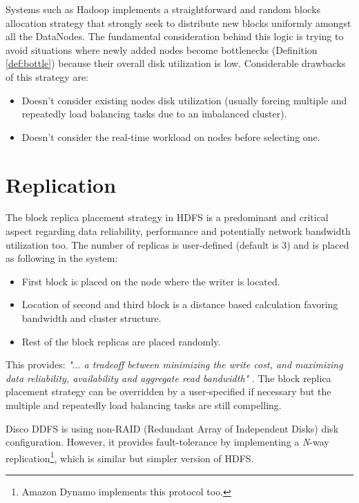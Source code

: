 Systems such as Hadoop implements a straightforward and random blocks allocation strategy that strongly seek to distribute new blocks uniformly amongst all the DataNodes. The fundamental consideration behind this logic is trying to avoid situations where newly added nodes become bottlenecks (Definition \ref{def:bottle}) because their overall disk utilization is low. Considerable drawbacks of this strategy are:

\begin{itemize}
	\item Doesn’t consider existing nodes disk utilization (usually forcing multiple and repeatedly load balancing tasks due to an imbalanced cluster).
	\item Doesn't consider the real-time workload on nodes before selecting one.
\end{itemize}

\section{Replication} \label{sec:replication}
The block replica placement strategy in HDFS is a predominant and critical aspect regarding data reliability, performance and potentially network bandwidth utilization too. The number of replicas is user-defined (default is 3) and is placed as following in the system:
\begin{itemize}
	\item First block is placed on the node where the writer is located.
	\item Location of second and third block is a distance based calculation favoring bandwidth and cluster structure.
	\item Rest of the block replicas are placed randomly. 
\end{itemize}

This provides: \textit{"$\ldots$ a tradeoff between minimizing the write cost, and maximizing data reliability, availability and aggregate read bandwidth"} \cite{Shvachko:2010:HDF:1913798.1914427}. The block replica placement strategy can be overridden by a user-specified if necessary but the multiple and repeatedly load balancing tasks are still compelling.

Disco DDFS is using non-RAID (Redundant Array of Independent Disks) disk configuration. However, it provides fault-tolerance by implementing a \textit{N}-way replication\footnote{Amazon Dynamo \cite{DeCandia:2007:DAH:1294261.1294281} implements this protocol too.}, which is similar but simpler version of HDFS.

